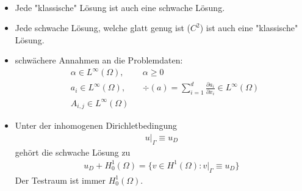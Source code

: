 \begin{bemerkung}\ %
	\begin{itemize}
		\item Jede "klassische" Lösung ist auch eine schwache Lösung.
		\item Jede schwache Lösung, welche glatt genug ist ($C^2$) ist auch eine "klassische" Lösung.
		\item schwächere Annahmen an die Problemdaten:
		\begin{align*}
			&\alpha\in L^\infty(\Omega), &&\alpha\geq0\\
			&a_i\in L^\infty(\Omega), &&\div(a)=\sum\limits_{i=1}^d\frac{\partial a_i}{\partial x_i}\in L^\infty(\Omega)\\
			&A_{i,j}\in L^\infty(\Omega)
		\end{align*}
		\item Unter der inhomogenen Dirichletbedingung
		\begin{align*}
			u|_\Gamma\equiv u_D
		\end{align*}
		gehört die schwache Lösung zu
		\begin{align*}
			u_D+H_0^1(\Omega)=\big\lbrace v\in H^1(\Omega):v|_\Gamma\equiv u_D\big\rbrace
		\end{align*}
		Der Testraum ist immer $H^1_0(\Omega)$.
	\end{itemize}
\end{bemerkung}

